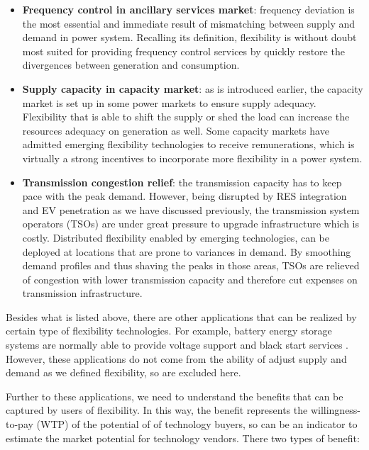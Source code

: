 \begin{itemize}
	\item \textbf{Frequency control in ancillary services market}: frequency deviation is the most essential and immediate result of mismatching between supply and demand in power system. Recalling its definition, flexibility is without doubt most suited for providing frequency control services by quickly restore the divergences between generation and consumption. 
	
	\item \textbf{Supply capacity in capacity market}: as is introduced earlier, the capacity market is set up in some power markets to ensure supply adequacy. Flexibility that is able to shift the supply or shed the load can increase the resources adequacy on generation as well. Some capacity markets have admitted emerging flexibility technologies to receive remunerations, which is virtually a strong incentives to incorporate more flexibility in a power system.
	
	\item \textbf{Transmission congestion relief}: the transmission capacity has to keep pace with the peak demand. However, being disrupted by RES integration and EV penetration as we have discussed previously, the transmission system operators (TSOs) are under great pressure to upgrade infrastructure which is costly. Distributed flexibility enabled by emerging technologies, can be deployed at locations that are prone to variances in demand. By smoothing demand profiles and thus shaving the peaks in those areas, TSOs are relieved of congestion with lower transmission capacity and therefore cut expenses on transmission infrastructure.
	
\end{itemize}

Besides what is listed above, there are other applications that can be realized by certain type of flexibility technologies. For example, battery energy storage systems are normally able to provide voltage support and black start services \cite{Eyer2010,Rastler2010,Akhil2015}. However, these applications do not come from the ability of adjust supply and demand as we defined flexibility, so are excluded here.

Further to these applications, we need to understand the benefits that can be captured by users of flexibility. In this way, the benefit represents the willingness-to-pay (WTP) of the potential of of technology buyers, so can be an indicator to estimate the market potential for technology vendors. There two types of benefit:

